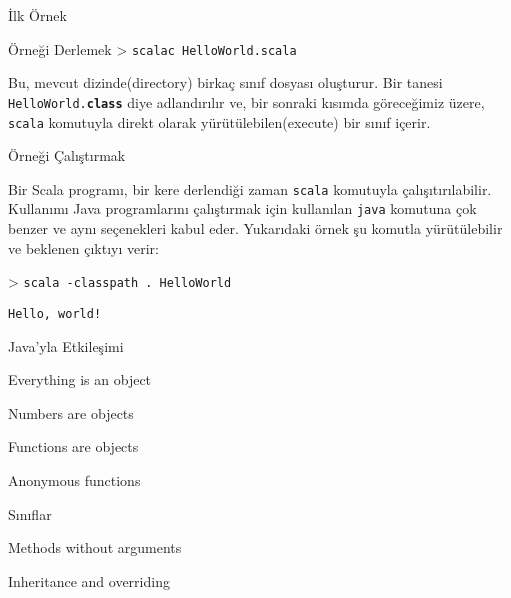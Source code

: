 \documentclass[10pt,a4paper]{book}
\begin{document}
\begin{chapter}{İlk Örnek}
\begin{section}{Örneği Derlemek}
> \texttt{scalac HelloWorld.scala}

Bu, mevcut dizinde(directory) birkaç sınıf dosyası oluşturur. Bir tanesi \texttt{HelloWorld.\textbf{class}} diye adlandırılır ve, bir sonraki kısımda göreceğimiz üzere, \texttt{scala} komutuyla direkt olarak yürütülebilen(execute) bir sınıf içerir.

\end{section}

\begin{section}{Örneği Çalıştırmak}

Bir Scala programı, bir kere derlendiği zaman \texttt{scala} komutuyla çalışıtırılabilir. Kullanımı Java programlarını çalıştırmak için kullanılan \texttt{java} komutuna çok benzer ve aynı seçenekleri kabul eder. Yukarıdaki örnek şu komutla yürütülebilir ve beklenen çıktıyı verir:

> \texttt{scala -classpath . HelloWorld}

\texttt{Hello, world!}

\end{section}

\end{chapter}

\begin{chapter}{Java'yla Etkileşimi}



\end{chapter}

\begin{chapter}{Everything is an object}

\begin{section}{Numbers are objects}

\end{section}

\begin{section}{Functions are objects}

\begin{subsection}{Anonymous functions}

\end{subsection}

\end{section}

\end{chapter}

\begin{chapter}{Sınıflar}

\begin{section}{Methods without arguments}

\end{section}

\begin{section}{Inheritance and overriding}

\end{section}

\end{chapter}
\end{document}

